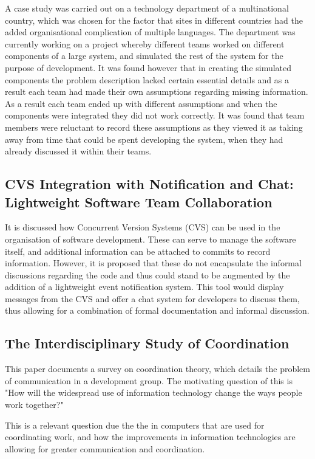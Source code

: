 \documentclass{l4proj}
\begin{document}
A case study was carried out on a technology department of a multinational country, which was chosen for the factor that sites in different countries had the added organisational complication of multiple languages.  The department was currently working on a project whereby different teams worked on different components of a large system, and simulated the rest of the system for the purpose of development.  It was found however that in creating the simulated components the problem description lacked certain essential details and as a result each team had made their own assumptions regarding missing information.  As a result each team ended up with different assumptions and when the components were integrated they did not work correctly.  It was found that team members were reluctant to record these assumptions as they viewed it as taking away from time that could be spent developing the system, when they had already discussed it within their teams.

\subsection {CVS Integration with Notification and Chat: Lightweight Software Team Collaboration}

It is discussed how Concurrent Version Systems (CVS) can be used in the organisation of software development. These can serve to manage the software itself, and additional information can be attached to commits to record information.  However, it is proposed that these do not encapsulate the informal discussions regarding the code and thus could stand to be augmented by the addition of a lightweight event notification system.  This tool would display messages from the CVS and offer a chat system for developers to discuss them, thus allowing for a combination of formal documentation and informal discussion.


\subsection {The Interdisciplinary Study of Coordination}

This paper documents a survey on coordination theory, which details the problem of communication in a development group.  The motivating question of this is "How will the widespread use of information technology change the ways people work together?"

This is a relevant question due the the in computers that are used for coordinating work, and how the improvements in information technologies are allowing for greater communication and coordination.
\end{document}

